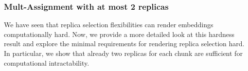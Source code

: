 \subsubsection{Mult-Assignment with at most 2 replicas}

We have seen that replica selection flexibilities can render embeddings computationally hard.
Now, we provide a more detailed look at this hardness result
and explore the minimal requirements for rendering replica selection hard.
In particular, we show that already two replicas for each chunk are sufficient for computational intractability.

%
%
%
